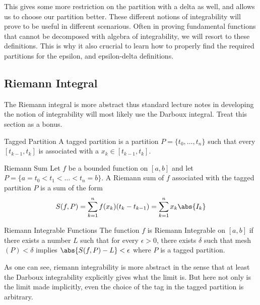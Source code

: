 This gives some more restriction on the partition with a delta as well, and allows us to choose our partition better. These different notions of integrability will prove to be useful in different scenarious. Often in proving fundamental functions that cannot be decomposed with algebra of integrability, we will resort to these definitions. This is why it also crucrial to learn how to properly find the required partitions for the epsilon, and epsilon-delta definitions. 

\subsection{Riemann Integral}
The Riemann integral is more abstract thus standard lecture notes in developing the notion of integrability will most likely use the Darboux integral. Treat this section as a bonus. 

\begin{defn}{Tagged Partition}{} A tagged partition is a partition $P=\{t_0,\dots,t_n\}$ such that every $[t_{k-1},t_k]$ is associated with a $x_k\in[t_{k-1},t_k]$. 
\end{defn}

\begin{defn}{Riemann Sum}{} Let $f$ be a bounded function on $[a,b]$ and let $P=\{a=t_0<t_1<\dots<t_n=b\}$. A Riemann sum of $f$ associated with the tagged partition $P$ is a sum of the form $$S(f,P)=\sum_{k=1}^{n}f(x_k)(t_k-t_{k-1})=\sum_{k=1}^nx_k\abs{I_k}$$
\end{defn}

\begin{defn}{Riemann Integrable Functions}{} The function $f$ is Riemann Integrable on $[a,b]$ if there exists a number $L$ such that for every $\epsilon>0$, there exists $\delta$ such that mesh$(P)<\delta$ implies $\abs{S(f,P)-L}<\epsilon$ where $P$ is a tagged partition. 
\end{defn}

As one can see, riemann integrability is more abstract in the sense that at least the Darboux integrability explicitly gives what the limit is. But here not only is the limit made implicitly, even the choice of the tag in the tagged partition is arbitrary. 

